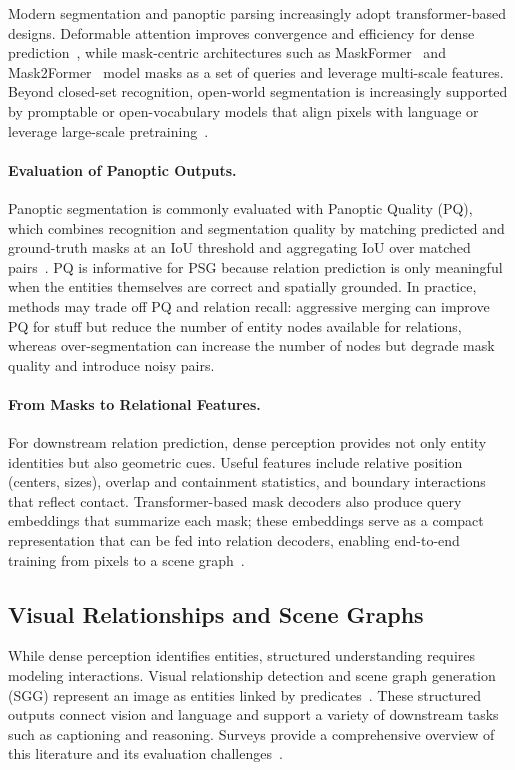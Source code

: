 Modern segmentation and panoptic parsing increasingly adopt transformer-based designs. Deformable attention improves convergence and efficiency for dense prediction~\citep{zhu2020deformable}, while mask-centric architectures such as MaskFormer~\citep{cheng2021per} and Mask2Former~\citep{cheng2022masked} model masks as a set of queries and leverage multi-scale features. Beyond closed-set recognition, open-world segmentation is increasingly supported by promptable or open-vocabulary models that align pixels with language or leverage large-scale pretraining~\citep{ghiasi2022scaling, zhang2023simple, kirillov2023segment}.

\paragraph{Evaluation of Panoptic Outputs.}
Panoptic segmentation is commonly evaluated with Panoptic Quality (PQ), which combines recognition and segmentation quality by matching predicted and ground-truth masks at an IoU threshold and aggregating IoU over matched pairs~\citep{kirillov2019panoptic}. PQ is informative for PSG because relation prediction is only meaningful when the entities themselves are correct and spatially grounded. In practice, methods may trade off PQ and relation recall: aggressive merging can improve PQ for stuff but reduce the number of entity nodes available for relations, whereas over-segmentation can increase the number of nodes but degrade mask quality and introduce noisy pairs.

\paragraph{From Masks to Relational Features.}
For downstream relation prediction, dense perception provides not only entity identities but also geometric cues. Useful features include relative position (centers, sizes), overlap and containment statistics, and boundary interactions that reflect contact. Transformer-based mask decoders also produce query embeddings that summarize each mask; these embeddings serve as a compact representation that can be fed into relation decoders, enabling end-to-end training from pixels to a scene graph~\citep{cheng2021per, cheng2022masked}.

\subsection{Visual Relationships and Scene Graphs}
While dense perception identifies entities, structured understanding requires modeling interactions. Visual relationship detection and scene graph generation (SGG) represent an image as entities linked by predicates~\citep{lu2016visual}. These structured outputs connect vision and language and support a variety of downstream tasks such as captioning and reasoning. Surveys provide a comprehensive overview of this literature and its evaluation challenges~\citep{cheng2022visual, zhu2022scene}.

